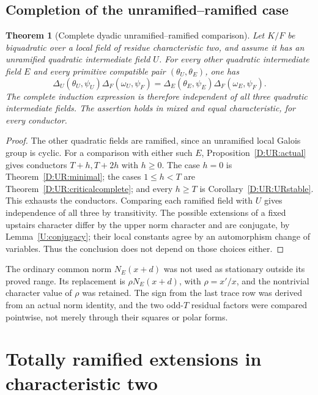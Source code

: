 \documentclass[11pt]{amsart}
\newtheorem{theorem}{Theorem}[section]
\theoremstyle{definition}
\theoremstyle{remark}
\begin{document}
\subsection{Completion of the unramified--ramified case}
\begin{theorem}[Complete dyadic unramified--ramified comparison]\label{D:UR:URall}
Let $K/F$ be biquadratic over a local field of residue characteristic two,
and assume it has an unramified quadratic intermediate field $U$.
For every other quadratic intermediate field $E$ and every primitive
compatible pair $(\theta_U,\theta_E)$, one has
\[
 \Delta_U(\theta_U,\psi_U)\Delta_F(\omega_U,\psi_F)
 =\Delta_E(\theta_E,\psi_E)\Delta_F(\omega_E,\psi_F).
\]
The complete induction expression is therefore independent of all three
quadratic intermediate fields. The assertion holds in mixed and equal
characteristic, for every conductor.
\end{theorem}
\begin{proof}
The other quadratic fields are ramified, since an unramified local Galois
group is cyclic. For a comparison with either such $E$,
Proposition~\ref{D:UR:actual} gives conductors $T+h,T+2h$ with $h\ge0$.
The case $h=0$ is Theorem~\ref{D:UR:minimal}; the cases $1\le h<T$ are
Theorem~\ref{D:UR:criticalcomplete}; and every $h\ge T$ is
Corollary~\ref{D:UR:URstable}. This exhausts the conductors. Comparing each
ramified field with $U$ gives independence of all three by transitivity.
The possible extensions of a fixed upstairs character differ by the
upper norm character and are conjugate, by Lemma~\ref{U:conjugacy}; their local
constants agree by an automorphism change of variables. Thus the
conclusion does not depend on those choices either.
\end{proof}

The ordinary common norm $N_E(x+d)$ was not used as stationary
outside its proved range. Its replacement is $\rho N_E(x+d)$, with
$\rho=x'/x$, and the nontrivial character value of $\rho$ was retained.
The sign from the last trace row was derived from an actual norm identity,
and the two odd-$T$ residual factors were compared pointwise, not merely
through their squares or polar forms.


\section{Totally ramified extensions in characteristic two}\label{sec:dyadic-equal}
\end{document}
